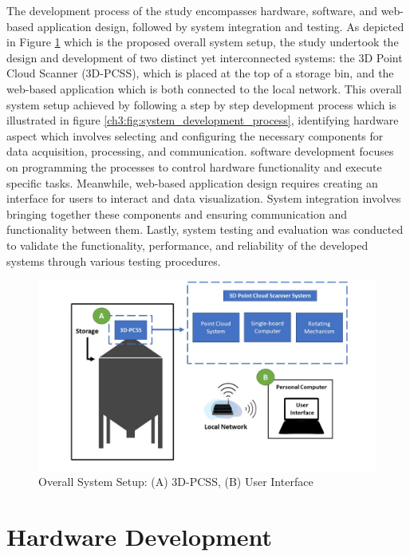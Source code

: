 The development process of the study encompasses hardware, software, and web-based application design, followed by system integration and testing. As depicted in Figure \ref{ch3:fig:overall_system_setup_development} which is the proposed overall system setup, the study undertook the design and development of two distinct yet interconnected systems: the 3D Point Cloud Scanner (3D-PCSS), which is placed at the top of a storage bin, and the web-based application which is both connected to the local network. This overall system setup achieved by following a step by step development process which is illustrated in figure \ref{ch3:fig:system_development_process}, identifying hardware aspect which involves selecting and configuring the necessary components for data acquisition, processing, and communication. software development focuses on programming the processes to control hardware functionality and execute specific tasks. Meanwhile, web-based application design requires creating an interface for users to interact and data visualization. System integration involves bringing together these components and ensuring communication and functionality between them. Lastly, system testing and evaluation was conducted to validate the functionality, performance, and reliability of the developed systems through various testing procedures.

\begin{figure}[H]
	\centering
	\includegraphics[width=1\textwidth]{Figures/system_analysis}
	\caption{Overall System Setup: (A) 3D-PCSS, (B) User Interface}
	\label{ch3:fig:overall_system_setup_development}
\end{figure}

\section{Hardware Development}
\label{ch3:sec:hardaware_design}

